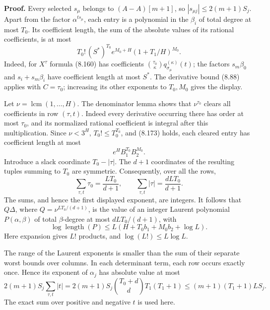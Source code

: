 \documentclass[
  11pt,
  a4paper,
]{article}
\begin{document}
\textbf{Proof.} Every selected \(s_\mu\) belongs to \((A-A)[m+1]\), so
\(|s_{\mu j}|\le2(m+1)S_j\). Apart from the factor \(\alpha^{ts_\mu}\),
each entry is a polynomial in the \(\beta_i\) of total degree at most
\(T_0\). Its coefficient length, the sum of the absolute values of its
rational coefficients, is at most \[
T_0!\,(S^*)^{T_0}
e^{M_0+H}(1+T_1/H)^{M_0}.
\] Indeed, for \(X^\tau\) formula (8.160) has coefficients
\(\binom{\tau_0}{\kappa}q_{\sigma_\mu}^{(\kappa)}(t)\); the factors
\(s_m\beta_0\) and \(s_i+s_m\beta_i\) have coefficient length at most
\(S^*\). The derivative bound (8.88) applies with \(C=\tau_0\);
increasing its other exponents to \(T_0,M_0\) gives the display.

Let \(\nu=\operatorname{lcm}(1,\ldots,H)\). The denominator lemma shows
that \(\nu^{\tau_0}\) clears all coefficients in row \((\tau,t)\).
Indeed every derivative occurring there has order at most \(\tau_0\),
and its normalized rational coefficient is integral after this
multiplication. Since \(\nu<3^H\), \(T_0!\le T_0^{T_0}\), and (8.173)
holds, each cleared entry has coefficient length at most \[
e^HB_1^{T_0}B_2^{M_0}.
\] Introduce a slack coordinate \(T_0-|\tau|\). The \(d+1\) coordinates
of the resulting tuples summing to \(T_0\) are symmetric. Consequently,
over all the rows, \[
\sum_{\tau,t}\tau_0=\frac{LT_0}{d+1},\qquad
\sum_{\tau,t}|\tau|=\frac{dLT_0}{d+1}.
\] The sums, and hence the first displayed exponent, are integers. It
follows that \(Q\Delta\), where \(Q=\nu^{LT_0/(d+1)}\), is the value of
an integer Laurent polynomial \(P(\alpha,\beta)\) of total
\(\beta\)-degree at most \(dLT_0/(d+1)\), with \[
\log\operatorname{length}(P)
\le L(H+T_0b_1+M_0b_2+\log L).
\] Here expansion gives \(L!\) products, and \(\log(L!)\le L\log L\).

The range of the Laurent exponents is smaller than the sum of their
separate worst bounds over columns. In each determinant term, each row
occurs exactly once. Hence its exponent of \(\alpha_j\) has absolute
value at most \[
2(m+1)S_j\sum_{\tau,t}|t|
=2(m+1)S_j\binom{T_0+d}{d}T_1(T_1+1)
\le (m+1)(T_1+1)LS_j.
\tag{8.176}
\] The exact sum over positive and negative \(t\) is used here.
\end{document}
